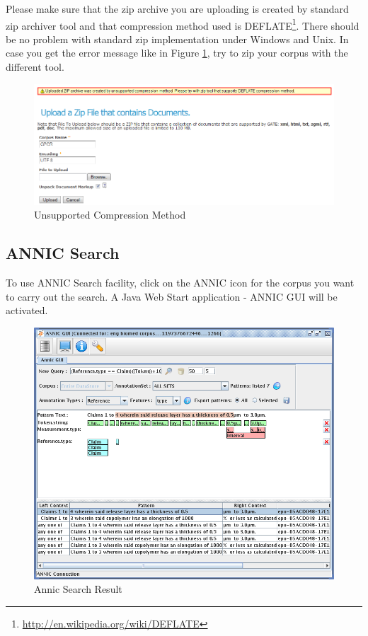 Please make sure that the zip archive you are uploading is created by standard
zip archiver tool and that compression method used is
DEFLATE\footnote{\url{http://en.wikipedia.org/wiki/DEFLATE}}. There should be no
problem with standard zip implementation under Windows and Unix.
In case you get the error message like in Figure
\ref{fig:unsupportedcompressionmethod},
try to zip your corpus with the different tool.
\begin{figure}
\centering
\includegraphics[scale=0.4]{unsupportedcompressionmethod}
\caption{Unsupported Compression Method}
\label{fig:unsupportedcompressionmethod}
\end{figure}

\subsection{ANNIC Search}
To use ANNIC Search facility, click on the ANNIC icon for the corpus you want
to carry out the search. A Java Web Start application - ANNIC GUI will be
activated. 

\begin{figure}[hb!]
\centering
\includegraphics[scale=0.4]{annicresult}
\caption{Annic Search Result}
\label{fig:annicresult}
\end{figure}


